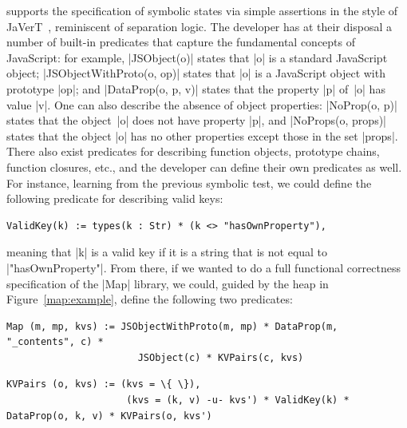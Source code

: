 \cosette supports the specification of symbolic states via simple assertions in the style of JaVerT~\cite{javert}, reminiscent of separation logic. The developer has at their disposal a number of built-in predicates that capture the fundamental concepts of JavaScript: for example, \jsinline|JSObject(o)| states that \jsinline|o| is a standard JavaScript object; \jsinline|JSObjectWithProto(o, op)| states that \jsinline|o| is a JavaScript object with prototype \jsinline|op|; and \jsinline|DataProp(o, p, v)| states that the property \jsinline|p| of~\jsinline|o| has value \jsinline|v|. One can also describe the absence of object properties: \jsinline|NoProp(o, p)| states that the object~\jsinline|o| does not have property \jsinline|p|, and \jsinline|NoProps(o, props)| states that the object \jsinline|o| has no other properties except those in the set \jsinline|props|. There also exist predicates for describing function objects, prototype chains, function closures, etc., and the developer can define their own predicates as well. For instance, learning from the previous symbolic test, we could define the following predicate for describing valid keys:
\begin{Verbatim}[fontsize=\footnotesize,commandchars=\\\{\}]
    ValidKey(k) := types(k : Str) * (k <> "hasOwnProperty"),
\end{Verbatim}
\noindent meaning that \jsinline|k| is a valid key if it is a string that is not equal to \jsinline|"hasOwnProperty"|. From there, if we wanted to do a full functional correctness specification of the \jsinline|Map| library, we could, guided by the heap in Figure~\ref{map:example}, define the following two predicates:


\smallskip
\begin{Verbatim}[fontsize=\footnotesize,commandchars=\\\{\}]
 Map (m, mp, kvs) := JSObjectWithProto(m, mp) * DataProp(m, "_contents", c) * 
                       JSObject(c) * KVPairs(c, kvs)
\end{Verbatim}
\begin{Verbatim}[fontsize=\footnotesize,commandchars=\\\{\}]
 KVPairs (o, kvs) := (kvs = \{ \}),
                     (kvs = (k, v) -u- kvs') * ValidKey(k) * DataProp(o, k, v) * KVPairs(o, kvs')
\end{Verbatim}

